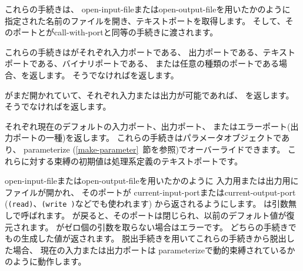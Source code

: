 \begin{entry}{%
}

これらの手続きは、
{\cf open-input-file}または{\cf open-output-file}を用いたかのように
指定された名前のファイルを開き、テキストポートを取得します。
そして、そのポートとが{\cf call-with-port}と同等の手続きに渡されます。
\end{entry}

\begin{entry}{%
}

これらの手続きはがそれぞれ入力ポートである、
出力ポートである、テキストポートである、バイナリポートである、
または任意の種類のポートである場合、\schtrue{}を返します。
そうでなければ\schfalse{}を返します。

\end{entry}


\begin{entry}{%
}

がまだ開かれていて、それぞれ入力または出力が可能であれば、
\schtrue{}を返します。 そうでなければ\schfalse{}を返します。


\end{entry}


\begin{entry}{%
}

それぞれ現在のデフォルトの入力ポート、出力ポート、
またはエラーポート(出力ポートの一種)を返します。
これらの手続きはパラメータオブジェクトであり、
{\cf parameterize} (\ref{make-parameter}~節を参照)でオーバーライドできます。
これらに対する束縛の初期値は処理系定義のテキストポートです。

\end{entry}


\begin{entry}{%
}

{\cf open-input-file}または{\cf open-output-file}を用いたかのように
入力用または出力用にファイルが開かれ、
そのポートが
{\cf current-input-port}または{\cf current-output-port}
({\tt (read)}、{\tt (write )}などでも使われます)
から返されるようにします。
は引数無しで呼ばれます。
が戻ると、そのポートは閉じられ、以前のデフォルト値が復元されます。
がゼロ個の引数を取らない場合はエラーです。
どちらの手続きでもの生成した値が返されます。
脱出手続きを用いてこれらの手続きから脱出した場合、
現在の入力または出力ポートは
{\cf parameterize}で動的束縛されているかのように動作します。


\end{entry}


